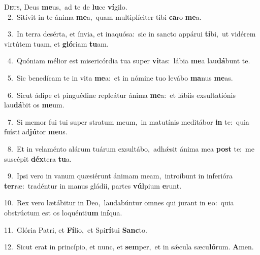 \lettrine{\initial\textcolor{\initialcolor}{D}}{eus,} Deus \textbf{me}\-us,~\star ad te de \textbf{lu}\-ce \textbf{ví}\-gilo.\\
{\numbfont\textcolor{\numbcolor}{~2.}}~Sitívit in te ánima \textbf{me}\-a,~\star quam multiplíciter tibi \textbf{ca}\-ro \textbf{me}\-a.\par
{\numbfont\textcolor{\numbcolor}{~3.}}~In terra desérta, et ínvia, et inaquósa:~\dagger sic in sancto appárui \textbf{ti}\-bi,~\star ut vidérem virtútem tuam, et \textbf{gló}\-riam \textbf{tu}\-am.\par
{\numbfont\textcolor{\numbcolor}{~4.}}~Quóniam mélior est misericórdia tua super \textbf{vi}\-tas:~\star lábia \textbf{me}\-a lau\-\textbf{dá}\-bunt te.\par
{\numbfont\textcolor{\numbcolor}{~5.}}~Sic benedícam te in vita \textbf{me}\-a:~\star et in nómine tuo levábo \textbf{ma}\-nus \textbf{me}\-as.\par
{\numbfont\textcolor{\numbcolor}{~6.}}~Sicut ádipe et pinguédine repleátur ánima \textbf{me}\-a:~\star et lábiis exsultatiónis lau\-\textbf{dá}\-bit os \textbf{me}\-um.\par
{\numbfont\textcolor{\numbcolor}{~7.}}~Si memor fui tui super stratum meum,~\dagger in matutínis meditábor \textbf{in} te:~\star quia fuísti ad\-\textbf{jú}\-tor \textbf{me}\-us.\par
{\numbfont\textcolor{\numbcolor}{~8.}}~Et in velaménto alárum tuárum exsultábo,~\dagger adhǽsit ánima mea \textbf{post} te:~\star me suscépit \textbf{déx}\-tera \textbf{tu}\-a.\par
{\numbfont\textcolor{\numbcolor}{~9.}}~Ipsi vero in vanum quæsiérunt ánimam meam,~\dagger introíbunt in inferióra \textbf{ter}\-ræ:~\star tradéntur in manus gládii, partes \textbf{vúl}\-pium \textbf{e}\-runt.\par
{\numbfont\textcolor{\numbcolor}{10.}}~Rex vero lætábitur in Deo,~\dagger laudabúntur omnes qui jurant in \textbf{e}\-o:~\star quia obstrúctum est os loquénti\textbf{um} in\-\textbf{í}\-qua.\par
{\numbfont\textcolor{\numbcolor}{11.}}~Glória Patri, et \textbf{Fí}\-lio,~\star et Spi\-\textbf{rí}\-tui \textbf{Sanc}\-to.\par
{\numbfont\textcolor{\numbcolor}{12.}}~Sicut erat in princípio, et nunc, et \textbf{sem}\-per,~\star et in sǽcula sæcu\-\textbf{ló}\-rum. \textbf{A}\-men.\par
